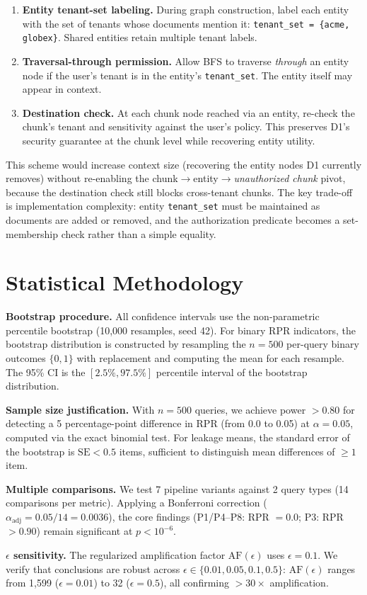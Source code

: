 \documentclass[letterpaper,twocolumn,10pt]{article}
\begin{document}
\begin{enumerate}
\item \textbf{Entity tenant-set labeling.} During graph construction,
  label each entity with the set of tenants whose documents mention it:
  \texttt{tenant\_set = \{acme, globex\}}. Shared entities retain
  multiple tenant labels.
\item \textbf{Traversal-through permission.} Allow BFS to traverse
  \emph{through} an entity node if the user's tenant is in the entity's
  \texttt{tenant\_set}. The entity itself may appear in context.
\item \textbf{Destination check.} At each chunk node reached via an
  entity, re-check the chunk's tenant and sensitivity against the
  user's policy. This preserves D1's security guarantee at the
  chunk level while recovering entity utility.
\end{enumerate}

\noindent This scheme would increase context size (recovering the
entity nodes D1 currently removes) without re-enabling the
chunk$\to$entity$\to$\emph{unauthorized chunk} pivot, because the
destination check still blocks cross-tenant chunks.  The key trade-off
is implementation complexity: entity \texttt{tenant\_set} must be
maintained as documents are added or removed, and the authorization
predicate becomes a set-membership check rather than a simple equality.

\section{Statistical Methodology}
\label{sec:stats-appendix}

\textbf{Bootstrap procedure.} All confidence intervals use the
non-parametric percentile bootstrap (10{,}000 resamples, seed 42).
For binary RPR indicators, the bootstrap distribution is constructed by
resampling the $n=500$ per-query binary outcomes $\{0, 1\}$ with
replacement and computing the mean for each resample.  The 95\% CI is
the $[2.5\%, 97.5\%]$ percentile interval of the bootstrap
distribution.

\textbf{Sample size justification.} With $n = 500$ queries, we achieve
power $> 0.80$ for detecting a 5 percentage-point difference in RPR
(from 0.0 to 0.05) at $\alpha = 0.05$, computed via the exact binomial
test.  For leakage means, the standard error of the bootstrap is
$\text{SE} < 0.5$ items, sufficient to distinguish mean differences of
$\geq 1$ item.

\textbf{Multiple comparisons.} We test 7 pipeline variants against 2
query types (14 comparisons per metric).  Applying a Bonferroni
correction ($\alpha_\text{adj} = 0.05/14 = 0.0036$), the core findings
(P1/P4--P8: RPR $= 0.0$; P3: RPR $> 0.90$) remain significant at
$p < 10^{-6}$.

\textbf{$\epsilon$ sensitivity.} The regularized amplification factor
$\text{AF}(\epsilon)$ uses $\epsilon = 0.1$.  We verify that
conclusions are robust across $\epsilon \in \{0.01, 0.05, 0.1, 0.5\}$:
$\text{AF}(\epsilon)$ ranges from 1{,}599 ($\epsilon{=}0.01$) to 32
($\epsilon{=}0.5$), all confirming $>$$30\times$ amplification.
\end{document}
